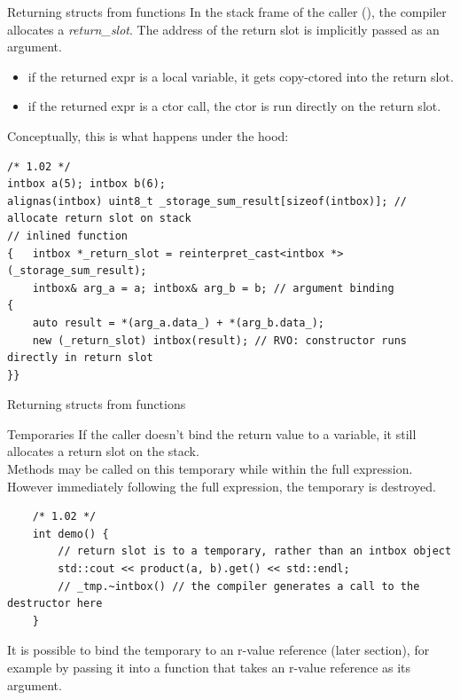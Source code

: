 \begin{frame}[fragile]{Returning structs from functions}
  In the stack frame of the caller (), the compiler allocates a \emph{return\_slot}.
  The address of the return slot is implicitly passed as an argument.
  \begin{itemize}
    \item if the returned expr is a local variable, it gets copy-ctored into the return slot.
    \item if the returned expr is a ctor call, the ctor is run directly on the return slot.
  \end{itemize}

  Conceptually, this is what happens under the hood:
  \begin{verbatim}
/* 1.02 */
intbox a(5); intbox b(6);
alignas(intbox) uint8_t _storage_sum_result[sizeof(intbox)]; // allocate return slot on stack
// inlined function
{   intbox *_return_slot = reinterpret_cast<intbox *>(_storage_sum_result);
    intbox& arg_a = a; intbox& arg_b = b; // argument binding
{
    auto result = *(arg_a.data_) + *(arg_b.data_);
    new (_return_slot) intbox(result); // RVO: constructor runs directly in return slot
}}
  \end{verbatim}
\end{frame}

\begin{frame}[fragile]{Returning structs from functions}
  
\end{frame}

\begin{frame}[fragile]{Temporaries}
  If the caller doesn't bind the return value to a variable,
  it still allocates a return slot on the stack.\\
  Methods may be called on this temporary while within the full expression.\\
  However immediately following the full expression, the temporary is destroyed.
  \begin{verbatim}
    /* 1.02 */
    int demo() {
        // return slot is to a temporary, rather than an intbox object
        std::cout << product(a, b).get() << std::endl;
        // _tmp.~intbox() // the compiler generates a call to the destructor here
    }
  \end{verbatim}

  It is possible to bind the temporary to an r-value reference (later section),
  for example by passing it into a function that takes an r-value reference as its argument.
\end{frame}

